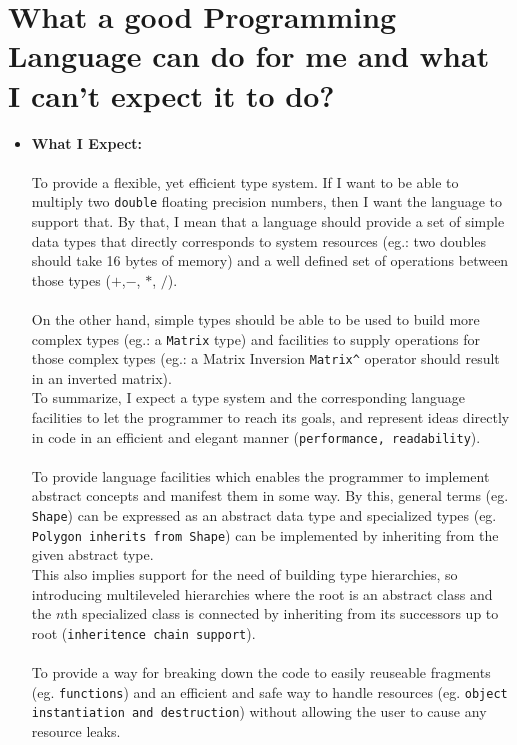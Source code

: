 \documentclass{article}
\begin{document}
 \section*{What a good Programming Language can do for me and what I can't expect it to do?}
 \begin{itemize}
  \item \textbf{What I Expect:}\\\\
  \-To provide a flexible, yet efficient type system. If I want to be able to multiply two \texttt{double} floating precision numbers, 
  then I want the language to support that. By that, I mean that a language should provide a set of simple data types
  that directly corresponds to system resources (eg.: two doubles should take 16 bytes of memory) and a well defined set of
  operations between those types ($+$,$-$, $*$, $/$).
  \\
  \\
  \-On the other hand, simple types should be able to be used to build more complex types (eg.: a \texttt{Matrix} type) and facilities
  to supply operations for those complex types (eg.: a Matrix Inversion \texttt{Matrix\^} operator should result in an inverted matrix).
  \\
  To summarize, I expect a type system and the corresponding language facilities to let the programmer to reach its goals,
  and represent ideas directly in code in an efficient and elegant manner (\texttt{performance, readability}).
  \\
  \\
  \-To provide language facilities which enables the programmer to implement abstract concepts and manifest them in some way.
    By this, general terms (eg. \texttt{Shape}) can be expressed as an abstract data type and specialized types (eg. \texttt{Polygon inherits from Shape}) can be 
    implemented by inheriting from the given abstract type.
    \\
    This also implies support for the need of building type hierarchies,
    so introducing multileveled hierarchies where the root is an abstract class and the $n$th specialized class is 
    connected by inheriting from its successors up to root (\texttt{inheritence chain support}).
  \\
  \\
  \-To provide a way for breaking down the code to easily reuseable fragments (eg. \texttt{functions}) and an efficient and safe way to 
    handle resources (eg. \texttt{object instantiation and destruction}) without allowing the user to cause any resource leaks.

\end{itemize}
\end{document}
